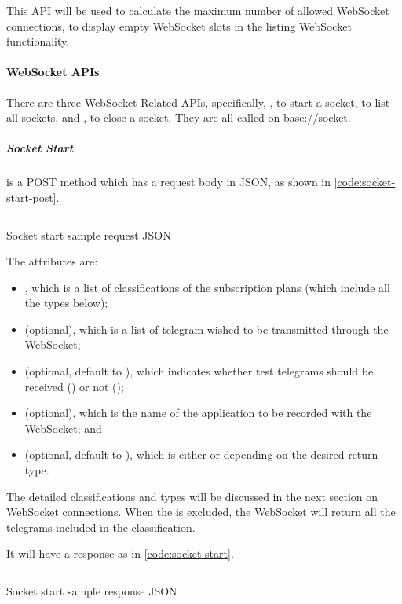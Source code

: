 This API will be used to calculate the maximum number of allowed WebSocket connections, to display empty WebSocket slots in the listing WebSocket functionality.

\paragraph{WebSocket APIs}

There are three WebSocket-Related APIs, specifically, , to start a socket,  to list all sockets, and , to close a socket. They are all called on \url{base://socket}.

\subparagraph{Socket Start}

 is a POST method which has a request body in JSON, as shown in \autoref{code:socket-start-post}.

\begin{listing}[htp]
    \inputminted{json}{code/SocketStartPost.json}
    \caption{Socket start sample request JSON}
    \label{code:socket-start-post}
\end{listing}

The attributes are:
\begin{itemize}
    \item {}, which is a list of classifications of the subscription plans (which include all the types below);
    \item {} (optional), which is a list of telegram wished to be transmitted through the WebSocket;
    \item {} (optional, default to ), which indicates whether test telegrams should be received () or not ();
    \item {} (optional), which is the name of the application to be recorded with the WebSocket; and
    \item {} (optional, default to ), which is either  or  depending on the desired return type.
\end{itemize}

The detailed classifications and types will be discussed in the next section on WebSocket connections. When the  is excluded, the WebSocket will return all the telegrams included in the classification.

It will have a response as in \autoref{code:socket-start}.

\begin{listing}[htp]
    \inputminted{json}{code/SocketStart.json}
    \caption{Socket start sample response JSON}
    \label{code:socket-start}
\end{listing}

